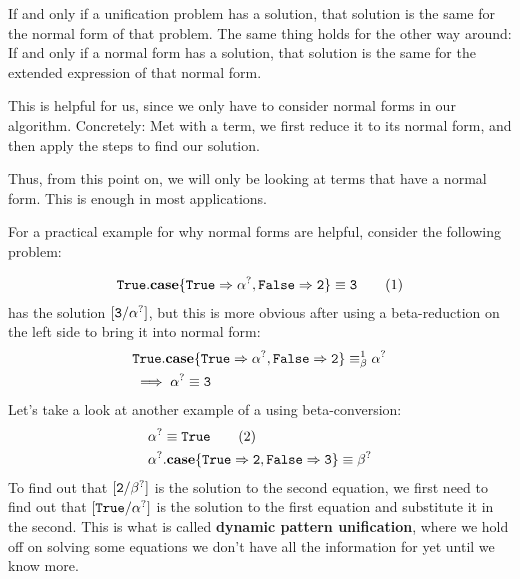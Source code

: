 \documentclass[twoside,12pt,a4paper]{article}
\begin{document}
\begin{theorem}
    If and only if a unification problem has a solution, that solution is the same for the normal form of that problem. 
    The same thing holds for the other way around: If and only if a normal form has a solution, that solution is the same for the extended expression of that normal form. 
\end{theorem}

This is helpful for us, since we only have to consider normal forms in our algorithm.
Concretely: Met with a term, we first reduce it to its normal form, and then apply the steps to find our solution.

Thus, from this point on, we will only be looking at terms that have a normal form. This is enough in most applications. %

For a practical example for why normal forms are helpful, consider the following problem:
\begin{example}
    \begin{align*}
        \mathtt{True}.\textbf{case}\{\mathtt{True} \Rightarrow \alpha^?, \mathtt{False} \Rightarrow \mathtt{2}\} \equiv \mathtt{3} \tag{1}
    \end{align*}
    has the solution $[\mathtt{3/\alpha^?}]$, but this is more obvious after using a beta-reduction on the left side 
    to bring it into normal form:
    \begin{align*}
        &\mathtt{True}.\textbf{case}\{\mathtt{True} \Rightarrow \alpha^?, \mathtt{False} \Rightarrow \mathtt{2}\} \equiv_{\beta}^1 \alpha^?\\
        &\implies \alpha^? \equiv \mathtt{3}   
    \end{align*}       
Let's take a look at another example of a using beta-conversion:
\begin{align*}
    &\alpha^? \equiv \mathtt{True} \tag{2}\\
    &\alpha^?.\textbf{case}\{\mathtt{True\Rightarrow 2, False\Rightarrow 3}\} \equiv \beta^?
\end{align*}
To find out that $[\mathtt{2}/\beta^?]$ is the solution to the second equation, we first need to find out that
$[\mathtt{True}/\alpha^?]$ is the solution to the first equation and substitute it in the second.
This is what is called \textbf{dynamic pattern unification}, where we hold off on solving some equations we don't have all the information for yet until we know more. 
 
\end{example}
\end{document}
